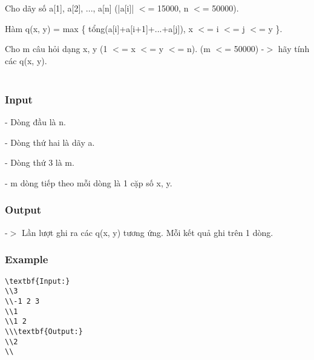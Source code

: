 



   Cho dãy số a[1], a[2], ..., a[n] (|a[i]| $<$= 15000, n $<$= 50000).  

   Hàm q(x, y) = max \{ tổng(a[i]+a[i+1]+...+a[j]), x $<$= i $<$= j $<$= y \}.  

   Cho m câu hỏi dạng x, y (1 $<$= x $<$= y $<$= n). (m $<$= 50000) -$>$ hãy tính các q(x, y).   
\\
\\

\subsubsection{   Input  }

   - Dòng đầu là n.  

   - Dòng thứ hai là dãy a.  

   - Dòng thứ 3 là m.  

   - m dòng tiếp theo mỗi dòng là 1 cặp số x, y.  

\subsubsection{   Output  }

   -$>$ Lần lượt ghi ra các q(x, y) tương ứng. Mỗi kết quả ghi trên 1 dòng.  

\subsubsection{   Example  }
\begin{verbatim}
\textbf{Input:}
\\3
\\-1 2 3
\\1
\\1 2
\\\textbf{Output:}
\\2
\\\end{verbatim}